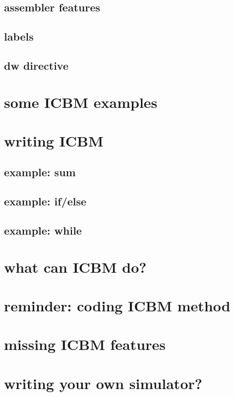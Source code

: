 

\subsection{assembler features}



\subsection{labels}

\subsection{dw directive}

\section{some ICBM examples}

\section{writing ICBM}


\subsection{example: sum}

\subsection{example: if/else}

\subsection{example: while}

\section{what can ICBM do?}


\section{reminder: coding ICBM method}



\section{missing ICBM features}

\section{writing your own simulator?}

